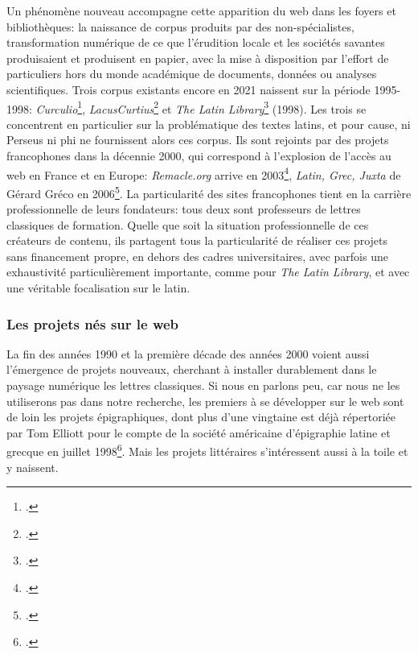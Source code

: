 Un phénomène nouveau accompagne cette apparition du web dans les foyers et bibliothèques: la naissance de corpus produits par des non-spécialistes, transformation numérique de ce que l'érudition locale et les sociétés savantes produisaient et produisent en papier, avec la mise à disposition par l'effort de particuliers hors du monde académique de documents, données ou analyses scientifiques. Trois corpus existants encore en 2021 naissent sur la période 1995-1998: \textit{Curculio}\footcite{hendry_curculio_1995}, \textit{LacusCurtius}\footcite{lomarcan_lacuscurtius_1999} et \textit{The Latin Library}\footcite{carey_latin_1998} (1998). Les trois se concentrent en particulier sur la problématique des textes latins, et pour cause, ni Perseus ni \acrshort{phi} ne fournissent alors ces corpus. Ils sont rejoints par des projets francophones dans la décennie 2000, qui correspond à l'explosion de l'accès au web en France et en Europe: \textit{Remacle.org} arrive en 2003\footcite{philippe_remacle_site_2008}, \textit{Latin, Grec, Juxta} de Gérard Gréco en 2006\footcite{gerard_greco_latin_2006}. La particularité des sites francophones tient en la carrière professionnelle de leurs fondateurs: tous deux sont professeurs de lettres classiques de formation. Quelle que soit la situation professionnelle de ces créateurs de contenu, ils partagent tous la particularité de réaliser ces projets sans financement propre, en dehors des cadres universitaires, avec parfois une exhaustivité particulièrement importante, comme pour \textit{The Latin Library}, et avec une véritable focalisation sur le latin.

\subsubsection{Les projets nés sur le web}

La fin des années 1990 et la première décade des années 2000 voient aussi l'émergence de projets nouveaux, cherchant à installer durablement dans le paysage numérique les lettres classiques. Si nous en parlons peu, car nous ne les utiliserons pas dans notre recherche, les premiers à se développer sur le web sont de loin les projets épigraphiques, dont plus d'une vingtaine est déjà répertoriée par Tom Elliott pour le compte de la société américaine d'épigraphie latine et grecque en juillet 1998\footcite{elliott_links_1998}. Mais les projets littéraires s'intéressent aussi à la toile et y naissent.

